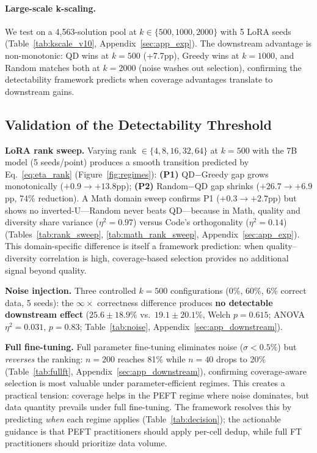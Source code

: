 \documentclass{article}
\theoremstyle{plain}
\theoremstyle{remark}
\begin{document}
\paragraph{Large-scale k-scaling.}
We test on a 4,563-solution pool at $k \in \{500, 1000, 2000\}$ with 5 LoRA seeds (Table~\ref{tab:kscale_v10}, Appendix~\ref{sec:app_exp}).
The downstream advantage is non-monotonic: QD wins at $k{=}500$ (+7.7pp), Greedy wins at $k{=}1000$, and Random matches both at $k{=}2000$ (noise washes out selection), confirming the detectability framework predicts when coverage advantages translate to downstream gains.

\subsection{Validation of the Detectability Threshold}
\label{sec:val_threshold}

\textbf{LoRA rank sweep.}
Varying rank $\in \{4, 8, 16, 32, 64\}$ at $k{=}500$ with the 7B model (5 seeds/point) produces a smooth transition predicted by Eq.~\ref{eq:eta_rank} (Figure~\ref{fig:regimes}):
\textbf{(P1)} QD$-$Greedy gap grows monotonically ($+0.9 \to +13.8$pp);
\textbf{(P2)} Random$-$QD gap shrinks ($+26.7 \to +6.9$pp, 74\% reduction).
A Math domain sweep confirms P1 ($+0.3 \to +2.7$pp) but shows no inverted-U---Random never beats QD---because in Math, quality and diversity share variance ($\eta^2{=}0.97$) versus Code's orthogonality ($\eta^2{=}0.14$) (Tables~\ref{tab:rank_sweep}, \ref{tab:math_rank_sweep}, Appendix~\ref{sec:app_exp}).
This domain-specific difference is itself a framework prediction: when quality--diversity correlation is high, coverage-based selection provides no additional signal beyond quality.


\textbf{Noise injection.}
Three controlled $k{=}500$ configurations (0\%, 60\%, 6\% correct data, 5 seeds): the $\infty\times$ correctness difference produces \textbf{no detectable downstream effect} ($25.6{\pm}18.9\%$ vs.\ $19.1{\pm}20.1\%$, Welch $p{=}0.615$; ANOVA $\eta^2{=}0.031$, $p{=}0.83$; Table~\ref{tab:noise}, Appendix~\ref{sec:app_downstream}).

\textbf{Full fine-tuning.}
Full parameter fine-tuning eliminates noise ($\sigma{<}0.5\%$) but \emph{reverses} the ranking: $n{=}200$ reaches 81\% while $n{=}40$ drops to 20\% (Table~\ref{tab:fullft}, Appendix~\ref{sec:app_downstream}), confirming coverage-aware selection is most valuable under parameter-efficient regimes.
This creates a practical tension: coverage helps in the PEFT regime where noise dominates, but data quantity prevails under full fine-tuning.
The framework resolves this by predicting \emph{when} each regime applies (Table~\ref{tab:decision}); the actionable guidance is that PEFT practitioners should apply per-cell dedup, while full FT practitioners should prioritize data volume.
\end{document}
